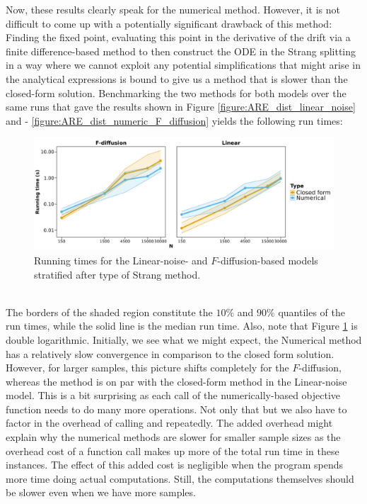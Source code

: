 Now, these results clearly speak for the numerical method. However, it is not difficult to come up with a potentially significant drawback of this method: Finding the fixed point, evaluating this point in the derivative of the drift via a finite difference-based method to then construct the ODE in the Strang splitting in a way where we cannot exploit any potential simplifications that might arise in the analytical expressions is bound to give us a method that is slower than the closed-form solution. Benchmarking the two methods for both models over the same runs that gave the results shown in Figure \ref{figure:ARE_dist_linear_noise} and - \ref{figure:ARE_dist_numeric_F_diffusion} yields the following run times:
\begin{figure}[h!]
    \begin{center}
    \includegraphics[scale = .09]{figures/Running_result_numeric.jpeg}
    \caption{Running times for the Linear-noise- and $F$-diffusion-based models stratified after type of Strang method.} 
    \label{figure:running_result_numeric}       
    \end{center}
\end{figure}\\
The borders of the shaded region constitute the $10\%$ and $90\%$ quantiles of the run times, while the solid line is the median run time. Also, note that Figure \ref{figure:running_result_numeric} is double logarithmic. Initially, we see what we might expect, the Numerical method has a relatively slow convergence in comparison to the closed form solution. However, for larger samples, this picture shifts completely for the $F$-diffusion, whereas the method is on par with the closed-form method in the Linear-noise model. This is a bit surprising as each call of the numerically-based objective function needs to do many more operations. Not only that but we also have to factor in the overhead of calling  and  repeatedly. The added overhead might explain why the numerical methods are slower for smaller sample sizes as the overhead cost of a function call makes up more of the total run time in these instances. The effect of this added cost is negligible when the program spends more time doing actual computations. Still, the computations themselves should be slower even when we have more samples. \\\\
